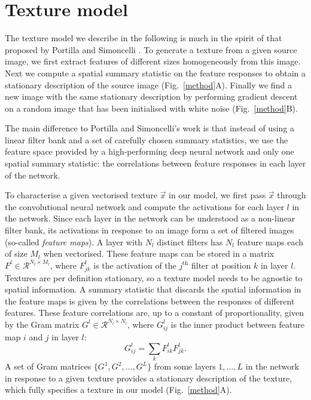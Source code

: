 \documentclass{article} %
\begin{document}
\section{Texture model}
The texture model we describe in the following is much in the spirit of that proposed by Portilla and Simoncelli \cite{portilla_parametric_2000}. To generate a texture from a given source image, we first extract features of different sizes homogeneously from this image. Next we compute a spatial summary statistic on the feature responses to obtain a stationary description of the source image (Fig.~\ref{method}A). Finally we find a new image with the same stationary description by performing gradient descent on a random image that has been initialised with white noise (Fig.~\ref{method}B). 

The main difference to Portilla and Simoncelli's work is that instead of using a linear filter bank and a set of carefully chosen summary statistics, we use the feature space provided by a high-performing deep neural network and only one spatial summary statistic: the correlations between feature responses in each layer of the network. 

To characterise a given vectorised texture $\vec{x}$ in our model, we first pass $\vec{x}$ through the convolutional neural network and compute the activations for each layer $l$ in the network.  Since each layer in the network can be understood as a non-linear filter bank, its activations in response to an image form a set of filtered images (so-called \emph{feature maps}). A layer with $N_l$ distinct filters has $N_l$ feature maps each of size $M_l$ when vectorised. 
These feature maps can be stored in a matrix $F^l \in \mathcal{R}^{N_l \times M_l}$, where $F_{jk}^l$ is the activation of the $j^\mathrm{th}$ filter at position $k$ in layer $l$. Textures are per definition stationary, so a texture model needs to be agnostic to spatial information. A summary statistic that discards the spatial information in the feature maps is given by the correlations between the responses of different features. These feature correlations are, up to a constant of proportionality, given by the Gram matrix $G^l \in \mathcal{R}^{N_l \times N_l}$, where $G_{ij}^l$ is the inner product between feature map $i$ and $j$ in layer $l$:
\begin{equation}
G_{ij}^l = \sum_k F_{ik}^l F_{jk}^l.
\label{gram}
\end{equation} 
A set of Gram matrices $\{G^1,G^2,...,G^L\}$ from some layers $1, \dots, L$ in the network in response to a given texture provides a stationary description of the texture, which fully specifies a texture in our model (Fig.~\ref{method}A).
\end{document}
